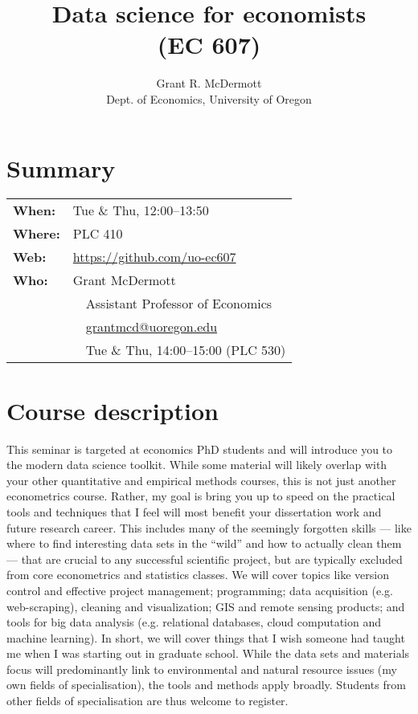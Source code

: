 \documentclass[12]{article}
\newcommand{\subtitle}[1]{%
	\posttitle{%
		\par\end{center}
	\begin{center}\large#1\end{center}
	\vskip0.5em}%
}
\begin{document}
\title{Data science for economists \\(EC 607)}
\subtitle{\textsc{Winter 2020 syllabus}\vspace{-2ex}}
\author{Grant R. McDermott\\ Dept. of Economics, University of Oregon}
\date{\vspace{-5ex}}
	
\maketitle

\section*{Summary}

\begin{tabular}{ll} 
	\textbf{When:} & Tue \& Thu, 12:00--13:50 \\
	\textbf{Where:} & PLC 410 \\
	\textbf{Web:} & \href{https://github.com/uo-ec607}{https://github.com/uo-ec607} \\
	\textbf{Who:} & Grant McDermott \\
	& \, \faMortarBoard \, Assistant Professor of Economics \\
	& \, \faEnvelopeO \, \href{mailto:grantmcd@uoregon.edu}{grantmcd@uoregon.edu} \\
	& \, \faHourglassHalf \, Tue \& Thu, 14:00--15:00 (PLC 530) \\
\end{tabular} 

\section*{Course description}

This seminar is targeted at economics PhD students and will introduce you to the modern data science toolkit. While some material will likely overlap with your other quantitative and empirical methods courses, this is not just another econometrics course. Rather, my goal is bring you up to speed on the practical tools and techniques that I feel will most benefit your dissertation work and future research career. This includes many of the seemingly forgotten skills --- like where to find interesting data sets in the ``wild'' and how to actually clean them --- that are crucial to any successful scientific project, but are typically excluded from core econometrics and statistics classes. We will cover topics like version control and effective project management; programming; data acquisition (e.g. web-scraping), cleaning and visualization; GIS and remote sensing products; and tools for big data analysis (e.g. relational databases, cloud computation and machine learning). In short, we will cover things that I wish someone had taught me when I was starting out in graduate school. While the data sets and materials focus will predominantly link to environmental and natural resource issues (my own fields of specialisation), the tools and methods apply broadly. Students from other fields of specialisation are thus welcome to register.
\end{document}
